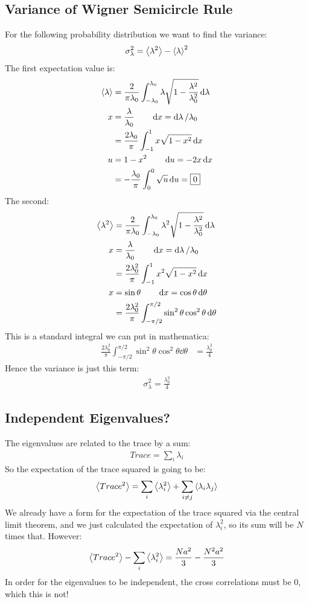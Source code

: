 \documentclass[12pt]{article}
\begin{document}
\subsection{Variance of Wigner Semicircle Rule}
For the following probability distribution we want to find the variance:
\begin{align*}
  \sigma^2_\lambda=\ev{\lambda^2}-\ev{\lambda}^2
\end{align*}
The first expectation value is:
\begin{align*}
  \ev{\lambda}&=\frac2{\pi\lambda_0}\int_{-\lambda_0}^{\lambda_0}\lambda
  \sqrt{1-\frac{\lambda^2}{\lambda_0^2}}\dd{\lambda}\\
  x&=\frac\lambda{\lambda_0}\qquad \dd{x}=\dd{\lambda}/\lambda_0\\
  &=\frac{2\lambda_0}{\pi}\int_{-1}^1x\sqrt{1-x^2}\dd{x}\\
  u&=1-x^2 \qquad \dd{u}=-2x\dd{x}\\
  &=-\frac{\lambda_0}\pi\int_0^0\sqrt{u}\dd{u}=\boxed{0}
\end{align*}
The second:
\begin{align*}
  \ev{\lambda^2}&=\frac2{\pi\lambda_0}\int_{-\lambda_0}^{\lambda_0}\lambda^2
  \sqrt{1-\frac{\lambda^2}{\lambda_0^2}}\dd{\lambda}\\
  x&=\frac\lambda{\lambda_0} \qquad \dd{x}=\dd{\lambda}/\lambda_0\\
  &=\frac{2\lambda_0^2}\pi\int_{-1}^1x^2\sqrt{1-x^2}\dd{x}\\
  x&=\sin\theta\qquad\dd{x}=\cos\theta\dd{\theta}\\
  &=\frac{2\lambda_0^2}\pi\int_{-\pi/2}^{\pi/2}\sin^2\theta\cos^2\theta\dd{\theta}
\end{align*}
This is a standard integral we can put in mathematica:
\begin{align*}
  \frac{2\lambda_0^2}\pi\int_{-\pi/2}^{\pi/2}\sin^2\theta\cos^2\theta\dd{\theta}
  &=\frac{\lambda_0^2}{4}
\end{align*}
Hence the variance is just this term:
\begin{align}
  \boxed{\sigma^2_\lambda=\frac{\lambda_0^2}{4}}
\end{align}
\subsection{Independent Eigenvalues?}
The eigenvalues are related to the trace by a sum:
\begin{align*}
  Trace=\sum_{i}\lambda_i
\end{align*}
So the expectation of the trace squared is going to be:
\begin{align*}
  \ev{Trace^2}=\sum_i\ev{\lambda_i^2}+\sum_{i\neq j}\ev{\lambda_i\lambda_j}
\end{align*}
We already have a form for the expectation of the trace squared via the central limit theorem, and we just calculated the expectation of $\lambda_i^2$, so its sum will be $N$ times that. However:
\begin{align*}
  \ev{Trace^2}-\sum_i\ev{\lambda_i^2}=\frac{Na^2}{3}-\frac{N^2a^2}{3}
\end{align*}
In order for the eigenvalues to be independent, the cross correlations must be $0$, which this is not!
\end{document}
